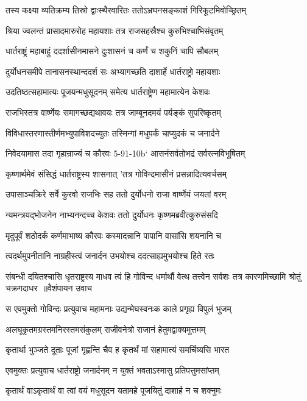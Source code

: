\twolineshloka
{तस्य कक्ष्या व्यतिक्रम्य तिस्रो द्वाःस्थैरवारितः}
{ततोऽभ्रघनसङ्काशं गिरिकूटमिवोच्छ्रितम्}


\twolineshloka
{श्रिया ज्वलन्तं प्रासादमारुरोह महायशाः}
{तत्र राजसहस्रैश्च कुरुभिश्चाभिसंवृतम्}


\twolineshloka
{धार्तराष्ट्रं महाबाहुं ददर्शासीनमासने}
{दुःशासनं च कर्णं च शकुनिं चापि सौबलम्}


\twolineshloka
{दुर्योधनसमीपे तानासनस्थान्ददर्श सः}
{अभ्यागच्छति दाशार्हे धार्तराष्ट्रो महायशाः}


\twolineshloka
{उदतिष्ठत्सहामात्यः पूजयन्मधुसूदनम्}
{समेत्य धार्तराष्ट्रेण महामात्येन केशवः}


\twolineshloka
{राजभिस्तत्र वार्ष्णेयः समागच्छद्यथावयः}
{तत्र जाम्बूनदमयं पर्यङ्कं सुपरिष्कृतम्}


\twolineshloka
{विविधास्तरणास्तीर्णमभ्युपाविशदच्युतः}
{तस्मिन्गां मधुपर्कं चाप्युदकं च जनार्दने}


\twolineshloka
{निवेदयामास तदा गृहान्राज्यं च कौरवः}
{5-91-10b` आसनंसर्वतोभद्रं सर्वरत्नविभूषितम्}


\twolineshloka
{कृष्णार्थमेवं संसिद्धं धार्तराष्ट्रस्य शासनात्}
{'तत्र गोविन्दमासीनं प्रसन्नादित्यवर्चसम्}


\twolineshloka
{उपासाञ्चक्रिरे सर्वे कुरवो राजभिः सह}
{ततो दुर्योधनो राजा वार्ष्णेयं जयतां वरम्}


\twolineshloka
{न्यमन्त्रयद्भोजनेन नाभ्यनन्दच्च केशवः}
{ततो दुर्योधनः कृष्णमब्रवीत्कुरुसंसदि}


\twolineshloka
{मृदुपूर्वं शठोदर्कं कर्णमाभाष्य कौरवः}
{कस्मादन्नानि पापानि वासांसि शयनानि च}


\twolineshloka
{त्वदर्थमुपनीतानि नाग्रहीस्त्वं जनार्दन}
{उभयोश्च ददत्साह्यमुभयोश्च हिते रतः}


\fourlineindentedshloka
{संबन्धी दयितश्चासि धृतराष्ट्रस्य माधव}
{त्वं हि गोविन्द धर्मार्थौ वेत्थ तत्त्वेन सर्वशः}
{तत्र कारणमिच्छामि श्रोतुं चक्रगदाधर ॥वैशंपायन उवाच}
{}


\twolineshloka
{स एवमुक्तो गोविन्दः प्रत्युवाच महामनाः}
{उद्यन्मेघस्वनःक काले प्रगृह्य विपुलं भुजम्}


\twolineshloka
{अलघूकृतमग्रस्तमनिरस्तमसंकुलम्}
{राजीवनेत्रो राजानं हेतुमद्वाक्यमुत्तमम्}


\twolineshloka
{कृतार्था भुञ्जते दूताः पूजां गृह्णन्ति चैव ह}
{कृतर्थं मां सहामात्यं समर्चिष्यसि भारत}


\twolineshloka
{एवमुक्तः प्रत्युवाच धार्तराष्ट्रो जनार्दनम्}
{न युक्तं भवताऽस्मासु प्रतिपत्तुमसांप्तम्}


\twolineshloka
{कृतार्थं वाऽकृतार्थं वा त्वां वयं मधुसूदन}
{यतामहे पूजयितुं दाशार्ह न च शक्नुमः}



